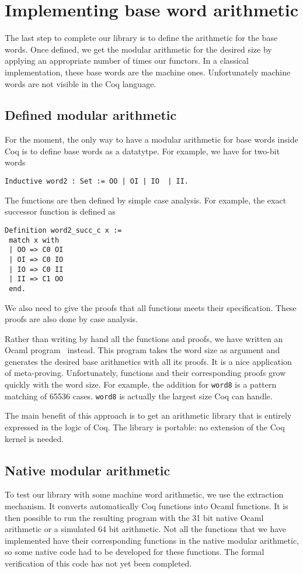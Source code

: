 \section{Implementing base word arithmetic \label{word}}

The last step to complete our library is to define the arithmetic for the base words. 
Once defined,  we get the modular arithmetic for the desired size by applying an appropriate
number of times our functors. In a classical implementation, these base words are the machine ones.
Unfortunately machine words are not visible in the {\sc Coq} language. 

\subsection{Defined modular arithmetic}

For the moment, the only way to have a modular arithmetic for base words inside {\sc Coq}
is to define base words as a datatytpe. For example, we have for two-bit words
\begin{verbatim}
Inductive word2 : Set := OO | OI | IO  | II.
\end{verbatim}
The functions are then defined by simple case analysis. For example,
the exact successor function is defined as
\begin{verbatim}
Definition word2_succ_c x :=
 match x with
 | OO => C0 OI
 | OI => C0 IO
 | IO => C0 II
 | II => C1 OO
 end.
\end{verbatim}
We also need to give the proofs that all functions meets their specification.
These proofs are also done by case analysis. 

Rather than writing by hand all the functions and proofs, we have
written an {\sc Ocaml} program~\cite{ocaml} instead. This program takes the word
size as argument and generates the desired base arithmetics with all
its proofs. It is a nice application of meta-proving. Unfortunately, 
functions and their corresponding proofs grow quickly with the word size. 
For example, the addition for {\tt word8} is a pattern matching of 65536 cases. 
{\tt word8} is actually the largest size {\sc Coq} can handle. 

The main benefit of  this approach is to get an arithmetic library that is entirely expressed 
in the logic of {\sc Coq}. The library is portable: no extension of the {\sc Coq} kernel 
is needed. 

\subsection{Native modular arithmetic}

To test our library with some machine word arithmetic, we use the extraction
mechanism. It converts automatically {\sc Coq} functions into {\sc Ocaml} functions.
It is then possible to run the resulting program with the 31 bit native
{\sc Ocaml} arithmetic or a simulated 64 bit arithmetic. 
Not all the functions that we have implemented have their corresponding functions in the 
native modular arithmetic, so some native code had to be developed for these functions.
The formal verification of this code has not yet been completed.